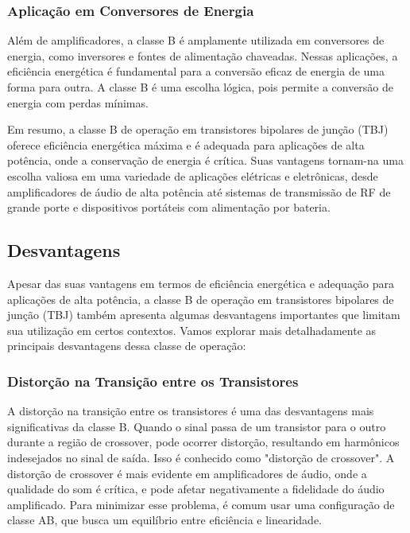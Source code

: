 \subsubsection{Aplicação em Conversores de Energia}

Além de amplificadores, a classe B é amplamente utilizada em conversores de energia, como inversores e fontes de alimentação chaveadas. Nessas aplicações, a eficiência energética é fundamental para a conversão eficaz de energia de uma forma para outra. A classe B é uma escolha lógica, pois permite a conversão de energia com perdas mínimas.

Em resumo, a classe B de operação em transistores bipolares de junção (TBJ) oferece eficiência energética máxima e é adequada para aplicações de alta potência, onde a conservação de energia é crítica. Suas vantagens tornam-na uma escolha valiosa em uma variedade de aplicações elétricas e eletrônicas, desde amplificadores de áudio de alta potência até sistemas de transmissão de RF de grande porte e dispositivos portáteis com alimentação por bateria.

\subsection{Desvantagens}

Apesar das suas vantagens em termos de eficiência energética e adequação para aplicações de alta potência, a classe B de operação em transistores bipolares de junção (TBJ) também apresenta algumas desvantagens importantes que limitam sua utilização em certos contextos. Vamos explorar mais detalhadamente as principais desvantagens dessa classe de operação:

\subsubsection{Distorção na Transição entre os Transistores}

A distorção na transição entre os transistores é uma das desvantagens mais significativas da classe B. Quando o sinal passa de um transistor para o outro durante a região de crossover, pode ocorrer distorção, resultando em harmônicos indesejados no sinal de saída. Isso é conhecido como "distorção de crossover". A distorção de crossover é mais evidente em amplificadores de áudio, onde a qualidade do som é crítica, e pode afetar negativamente a fidelidade do áudio amplificado. Para minimizar esse problema, é comum usar uma configuração de classe AB, que busca um equilíbrio entre eficiência e linearidade.

